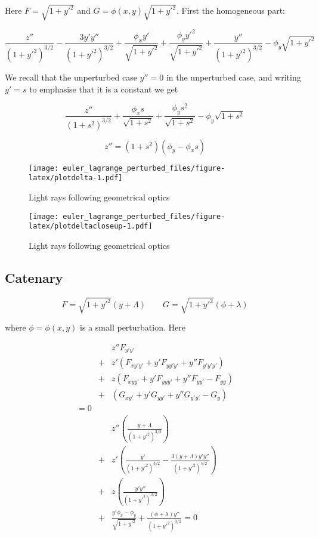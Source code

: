 \documentclass[pdflatex,sn-mathphys-num]{sn-jnl}%
\theoremstyle{thmstyleone}%
\theoremstyle{thmstyletwo}%
\theoremstyle{thmstylethree}%
\begin{document}
Here $F=\sqrt{1+y'^2}$ and $G=\phi(x,y)\sqrt{1+y'^2}$.  First the homogeneous part:

\begin{equation}
  \frac{z''}{(1+y'^2)^{3/2}} -\frac{3y'y''}{(1+y'^2)^{3/2}} +
  \frac{\phi_xy'}{\sqrt{1+y'^2}} + \frac{\phi_yy'^2}{\sqrt{1+y'^2}} + \frac{y''}{(1+y'^2)^{3/2}}-\phi_y\sqrt{1+y'^2}
\end{equation}


We recall that the unperturbed case $y''=0$ in the unperturbed case,
and writing $y'=s$ to emphasise that it is a constant we get

\begin{equation}
  \frac{z''}{(1+s^2)^{3/2}} +
  \frac{\phi_xs}{\sqrt{1+s^2}} + \frac{\phi_ys^2}{\sqrt{1+s^2}} -\phi_y\sqrt{1+s^2}
\end{equation}

\begin{equation}
  z'' = (1+s^2)(\phi_y-\phi_xs)
\end{equation}

\begin{figure}[h]
\centering
\texttt{[image: euler\_lagrange\_perturbed\_files/figure-latex/plotdelta-1.pdf]}
\caption{Light rays following geometrical optics}\label{plotdelta}
\end{figure}

\begin{figure}[h]
\centering
\texttt{[image: euler\_lagrange\_perturbed\_files/figure-latex/plotdeltacloseup-1.pdf]}
\caption{Light rays following geometrical optics}\label{plotdeltacloseup}
\end{figure}


\subsection{Catenary}

\begin{equation}\label{FandG}
F = \sqrt{1+y'^2}(y + \Lambda)\qquad G =  \sqrt{1+y'^2}(\phi + \lambda)
\end{equation}

where $\phi=\phi(x,y)$ is a small perturbation.  Here 

\begin{eqnarray}
&{}& z''F_{y'y'}\nonumber\\
&+& z'(F_{xy'y'} + y'F_{yy'y'} + y''F_{y'y'y'})\nonumber\\
&+& z (F_{xyy'} + y'F_{yyy'} + y''F_{yy'}-F_{yy})\nonumber\\
&+& (G_{xy'} + y'G_{yy'} + y''G_{y'y'}- G_{y})\nonumber\\
= 0\\
&{}&  z''\left(\frac{y+\Lambda}{(1+y'^2)^{3/2}}\right)\nonumber\\
&+& z' \left(\frac{y'}{(1+y'^2)^{3/2}} -\frac{3(y+\Lambda)y'y''}{(1+y'^2)^{5/2}}\right)\nonumber\\
&+& z  \left(\frac{y'y''}{(1+y'^2)^{3/2}}\right)\nonumber\\
&+& \frac{y'\phi_x-\phi_y}{\sqrt{1+y'^2}} + \frac{(\phi+\lambda)y''}{(1+y'^2)^{3/2}}=0
\end{eqnarray}
\end{document}
